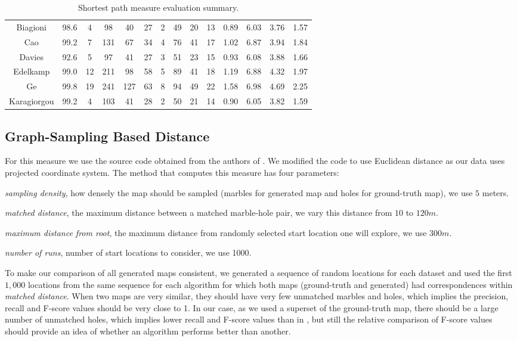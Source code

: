 \documentclass[natbib]{svjour3}                    \smartqed  \usepackage[table]{xcolor}
\begin{document}
\begin{table}[htbp]
{\begin{tabular}{|c||c|c c c c|c c c c|c c c c|}
Biagioni&98.6&4&98&40&27&2&49&20&13&0.89&6.03&3.76&1.57\\
Cao&99.2&7&131&67&34&4&76&41&17&1.02&6.87&3.94&1.84\\
\cellcolor{gray!25}Davies&\cellcolor{gray!25}92.6&\cellcolor{gray!25}5&\cellcolor{gray!25}97&\cellcolor{gray!25}41&\cellcolor{gray!25}27&3&51&23&15&0.93&6.08&3.88&1.66\\
Edelkamp&99.0&12&211&98&58&5&89&41&18&1.19&6.88&4.32&1.97\\
Ge&99.8&19&241&127&63&8&94&49&22&1.58&6.98&4.69&2.25\\
\cellcolor{gray!40}Karagiorgou&\cellcolor{gray!40}99.2&\cellcolor{gray!40}4&\cellcolor{gray!40}103&\cellcolor{gray!40}41&\cellcolor{gray!40}28&2&50&21&14&0.90&6.05&3.82&1.59\\
\hline
\end{tabular}
}
\caption{Shortest path measure evaluation summary.} 
\label{tab:sp_summary}
\end{table}

\subsection{Graph-Sampling Based Distance}

For this measure we use the source code obtained from the authors of \cite{be-irmgp-12}. We modified the code to use Euclidean distance as our data uses projected coordinate system. The method that computes this measure has four parameters: 
\begin{inparaenum}
\item{\emph{sampling density}, how densely the map should be sampled (marbles for generated map and holes for ground-truth map), we use $5$ meters.}
\item{\emph{matched distance}, the maximum distance between a matched marble-hole pair, we vary this distance from $10$ to $120m$.}
\item{\emph{maximum distance from root}, the maximum distance from randomly selected start location one will explore, we use $300m$.}
\item{\emph{number of runs}, number of start locations to consider, we use 1000.}
\end{inparaenum}
To make our comparison of all generated maps consistent, we generated a sequence of random locations for each dataset and used the first $1,000$ locations from the same sequence for each algorithm for which both maps (ground-truth and generated) had correspondences within \emph{matched distance}. When two maps are very similar, they should have very few unmatched marbles and holes, which implies the precision, recall and F-score values should be very close to 1. In our case, as we used a superset of the ground-truth map, there should be a large number of unmatched holes, which implies lower recall and F-score values than in \cite{be-irmgp-12}, but still the relative comparison of F-score values should provide an idea of whether an algorithm performs better than another.
\end{document}
